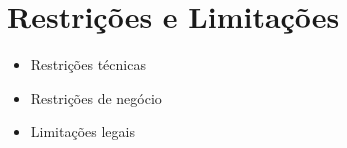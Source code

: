 \section{Restrições e Limitações}
\begin{itemize}
    \item Restrições técnicas
    \item Restrições de negócio
    \item Limitações legais
\end{itemize} 